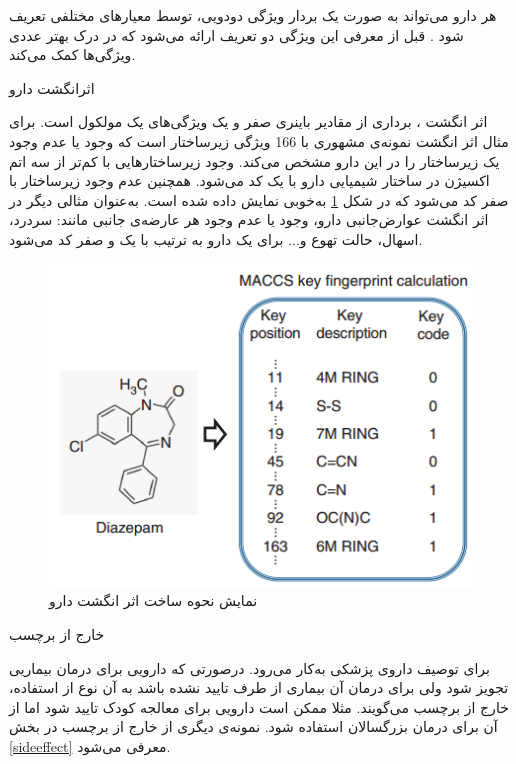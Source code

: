 \par
هر دارو می‌تواند به صورت یک بردار ویژگی دودویی، توسط معیار‌های مختلفی تعریف شود
\cite{cheng2014machine, zhang2017predicting}.
قبل از معرفی این ویژگی دو تعریف ارائه می‌شود که در درک بهتر عددی ویژگی‌ها کمک می‌کند.

\begin{definition}{اثر‌انگشت دارو}
  
اثر انگشت
،
برداری از مقادیر باینری صفر و یک ویژگی‌های یک مولکول است. برای مثال اثر انگشت
نمونه‌ی‌ مشهوری با 166 ویژگی زیرساختار است که وجود یا عدم وجود یک زیرساختار را در این دارو مشخص می‌کند. وجود زیرساختارهایی با کم‌تر از سه اتم اکسیژن در ساختار شیمیایی دارو با یک کد می‌شود. همچنین عدم وجود زیر‌ساختار 
با صفر کد می‌شود که در شکل  
\ref{fs6}
به‌خوبی نمایش داده شده ‌است. به‌عنوان مثالی دیگر در اثر انگشت عوارض‌جانبی دارو، وجود یا عدم وجود هر عارضه‌ی جانبی مانند: سردرد، اسهال، حالت تهوع و... برای یک دارو به ترتیب با یک و صفر کد می‌شود.
  
\begin{figure}[!h]
	\centering
	\includegraphics[scale=0.85]{section1/fing.png}
	\caption{نمایش نحوه ساخت اثر انگشت دارو}
	\label{fs6}
\end{figure} 

\end{definition}

\begin{definition}{خارج از برچسب}

برای توصیف داروی پزشکی به‌کار می‌رود. درصورتی که دارویی برای درمان بیماریی تجویز شود ولی برای درمان آن بیماری از طرف 
تایید نشده باشد به آن نوع از استفاده، خارج از برچسب
می‌گویند. مثلا ممکن است دارویی برای معالجه کودک تایید شود اما از آن برای درمان بزرگسالان استفاده شود. نمونه‌ی دیگری از خارج از برچسب در بخش 
\ref{sideeffect}
معرفی می‌شود.
\end{definition}


